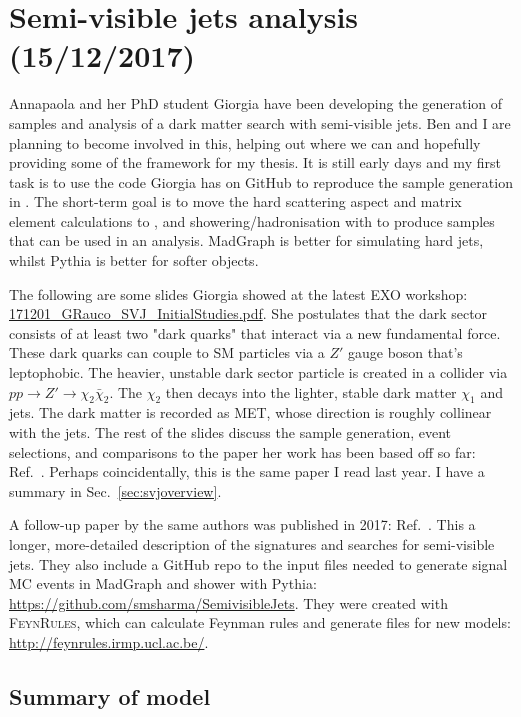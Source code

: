 
\chapter{Semi-visible jets analysis (15/12/2017)}

Annapaola and her PhD student Giorgia have been developing the generation of samples and analysis of a dark matter search with semi-visible jets. Ben and I are planning to become involved in this, helping out where we can and hopefully providing some of the framework for my thesis. It is still early days and my first task is to use the code Giorgia has on GitHub to reproduce the sample generation in \PYTHIA. The short-term goal is to move the hard scattering aspect and matrix element calculations to \madgraph, and showering/hadronisation with \PYTHIA to produce samples that can be used in an analysis. MadGraph is better for simulating hard jets, whilst Pythia is better for softer objects.

The following are some slides Giorgia showed at the latest EXO workshop: \href{run:sec35/171201_GRauco_SVJ_InitialStudies.pdf}{171201\_GRauco\_SVJ\_InitialStudies.pdf}. She postulates that the dark sector consists of at least two "dark quarks" that interact via a new fundamental force. These dark quarks can couple to SM particles via a $Z'$ gauge boson that's leptophobic. The heavier, unstable dark sector particle is created in a collider via $pp \rightarrow Z' \rightarrow \chi_2 \bar{\chi}_2$. The $\chi_2$ then decays into the lighter, stable dark matter $\chi_1$ and jets. The dark matter is recorded as MET, whose direction is roughly collinear with the jets. The rest of the slides discuss the sample generation, event selections, and comparisons to the paper her work has been based off so far: Ref.~\cite{Cohen:2015toa}. Perhaps coincidentally, this is the same paper I read last year. I have a summary in Sec.~\ref{sec:svjoverview}.

A follow-up paper by the same authors was published in 2017: Ref.~\cite{Cohen:2017pzm}. This a longer, more-detailed description of the signatures and searches for semi-visible jets. They also include a GitHub repo to the input files needed to generate signal MC events in MadGraph and shower with Pythia: \url{https://github.com/smsharma/SemivisibleJets}. They were created with \textsc{FeynRules}, which can calculate Feynman rules and generate files for new models: \url{http://feynrules.irmp.ucl.ac.be/}.


\section{Summary of model}

